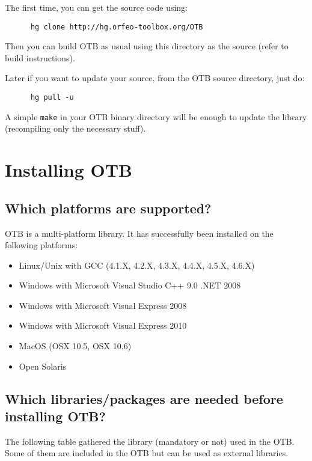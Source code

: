 The first time, you can get the source code using:
\begin{verbatim}
      hg clone http://hg.orfeo-toolbox.org/OTB
\end{verbatim}

Then you can build OTB as usual using this directory as the source (refer to build instructions).

Later if you want to update your source, from the OTB source directory, just do:
\begin{verbatim}
      hg pull -u
\end{verbatim}

A simple \texttt{make} in your OTB binary directory will be enough to update the library (recompiling only the necessary stuff).


\section{Installing OTB}
\label{sec:FAQInstall}
\subsection{Which platforms are supported?}
OTB is a multi-platform library. It has successfully been installed on
the following platforms:
\begin{itemize}
  \item Linux/Unix with GCC (4.1.X, 4.2.X, 4.3.X, 4.4.X, 4.5.X, 4.6.X)
  \item Windows with Microsoft Visual Studio C++ 9.0 .NET 2008
  \item Windows with Microsoft Visual Express 2008
  \item Windows with Microsoft Visual Express 2010
  \item MacOS (OSX 10.5, OSX 10.6)
  \item Open Solaris
\end{itemize}

\subsection{Which libraries/packages are needed before installing
 OTB?}
The following table gathered the library (mandatory or not) used in the OTB. Some of them are included in the OTB but can be used as external libraries.


